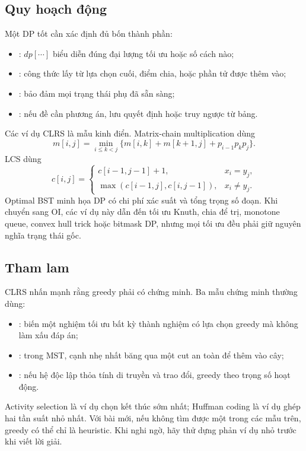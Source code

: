 \documentclass[11pt]{article}
\begin{document}
\subsection{Quy hoạch động}

Một DP tốt cần xác định đủ bốn thành phần:
\begin{itemize}
  \item {}: \(dp[\cdots]\) biểu diễn đúng đại lượng tối ưu hoặc
        số cách nào;
  \item {}: công thức lấy từ lựa chọn cuối, điểm chia, hoặc phần tử
        được thêm vào;
  \item {}: bảo đảm mọi trạng thái phụ đã sẵn sàng;
  \item {}: nếu đề cần phương án, lưu quyết định hoặc truy
        ngược từ bảng.
\end{itemize}

Các ví dụ CLRS là mẫu kinh điển. Matrix-chain multiplication dùng
\[
  m[i,j]=\min_{i\le k<j}\{m[i,k]+m[k+1,j]+p_{i-1}p_kp_j\}.
\]
LCS dùng
\[
  c[i,j]=
  \begin{cases}
    c[i-1,j-1]+1, & x_i=y_j,\\
    \max(c[i-1,j],c[i,j-1]), & x_i\ne y_j.
  \end{cases}
\]
Optimal BST minh họa DP có chi phí xác suất và tổng trọng số đoạn. Khi chuyển
sang OI, các ví dụ này dẫn đến tối ưu Knuth, chia để trị, monotone queue,
convex hull trick hoặc bitmask DP, nhưng mọi tối ưu đều phải giữ nguyên nghĩa
trạng thái gốc.

\subsection{Tham lam}

CLRS nhấn mạnh rằng greedy phải có chứng minh. Ba mẫu chứng minh thường dùng:
\begin{itemize}
  \item {}: biến một nghiệm tối ưu bất kỳ thành nghiệm có
        lựa chọn greedy mà không làm xấu đáp án;
  \item {}: trong MST, cạnh nhẹ nhất băng qua một cut an toàn
        để thêm vào cây;
  \item {}: nếu hệ độc lập thỏa tính di truyền và trao đổi, greedy
        theo trọng số hoạt động.
\end{itemize}

Activity selection là ví dụ chọn kết thúc sớm nhất; Huffman coding là ví dụ
ghép hai tần suất nhỏ nhất. Với bài mới, nếu không tìm được một trong các mẫu
trên, greedy có thể chỉ là heuristic. Khi nghi ngờ, hãy thử dựng phản ví dụ nhỏ
trước khi viết lời giải.
\end{document}
